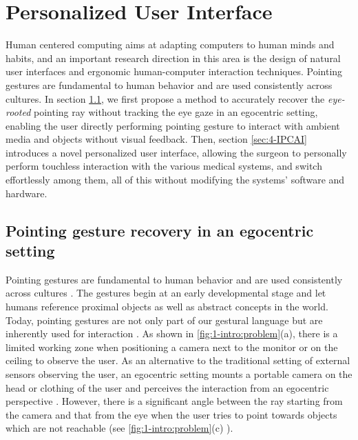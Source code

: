 %
\chapter{Personalized User Interface} \label{chapter:4}
Human centered computing aims at adapting computers to human minds and habits, and an important research direction in this area is the design of natural user interfaces and ergonomic human-computer interaction techniques.
Pointing gestures are fundamental to human behavior and are used consistently across cultures.
In section \ref{section:4-PAST}, we first propose a method to accurately recover the \textit{eye-rooted} pointing ray without tracking the eye gaze in an egocentric setting, enabling the user directly performing pointing gesture to interact with ambient media and objects without visual feedback. 
Then, section \ref{sec:4-IPCAI} introduces a novel personalized user interface, allowing the surgeon to personally perform touchless interaction with the various medical systems, and switch effortlessly among them, all of this without modifying the systems' software and hardware.

\section{Pointing gesture recovery in an egocentric setting}
\label{section:4-PAST}
Pointing gestures are fundamental to human behavior \citep{Matthews2012} and are used consistently across cultures  \citep{McNeill2000}. The gestures begin at an early developmental stage \citep{Carpendale2010} and let humans reference proximal objects as well as abstract concepts in the world. Today, pointing gestures are not only part of our gestural language but are inherently used for interaction \citep{Nanayakkara2013a}.
As shown in \figurename{\ref{fig:1-intro:problem}(a)}, there is a limited working zone when positioning a camera next to the monitor or on the ceiling to observe the user.
As an alternative to the traditional setting of external sensors observing the user, an egocentric setting mounts a portable camera on the head or clothing of the user and perceives the interaction from an egocentric perspective \citep{Fathi2011,Li2015}. However, there is a significant angle between the ray starting from the camera and that from the eye when the user tries to point towards objects which are not reachable (see \figurename{\ref{fig:1-intro:problem}(c)} ).
 
